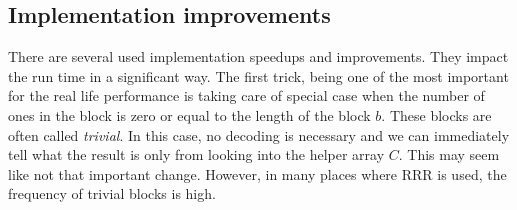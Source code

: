\subsection{Implementation improvements}

There are several used implementation speedups and improvements. They impact the run time in a
significant way. The first trick, being one of the most important for the real
life performance is taking care of special case when the number of ones in the block is zero
or equal to the length of the block $b$. These blocks are often called \textit{trivial}. In this
case, no decoding is necessary and we can immediately tell what the result is only from looking
into the helper array $C$. This may seem like not that important change. However, in many places
where RRR is used, the frequency of trivial blocks is high.
